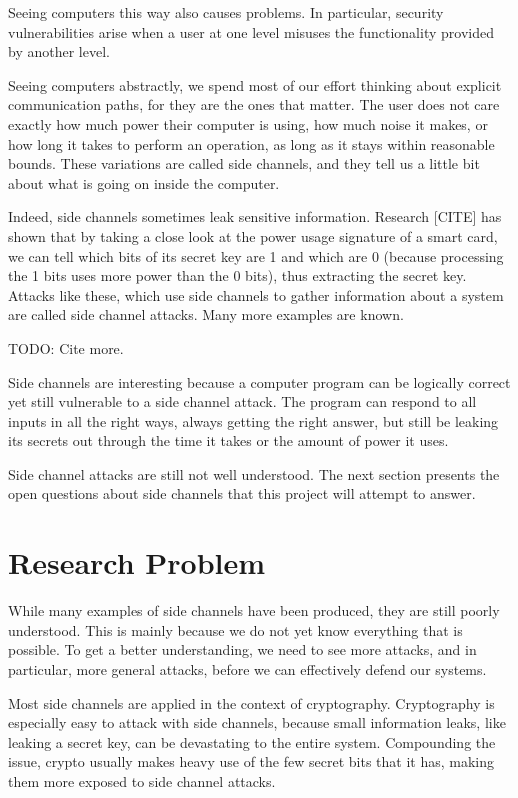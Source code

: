 \documentclass{acm_proc_article-sp}
\begin{document}
Seeing computers this way also causes problems. In particular, security
vulnerabilities arise when a user at one level misuses the functionality
provided by another level.

Seeing computers abstractly, we spend most of our effort thinking about explicit
communication paths, for they are the ones that matter. The user does not care
exactly how much power their computer is using, how much noise it makes, or how
long it takes to perform an operation, as long as it stays within reasonable
bounds. These variations are called side channels, and they tell us a little bit
about what is going on inside the computer.

Indeed, side channels sometimes leak sensitive information. Research [CITE] has
shown that by taking a close look at the power usage signature of a smart card,
we can tell which bits of its secret key are 1 and which are 0 (because
processing the 1 bits uses more power than the 0 bits), thus extracting the
secret key. Attacks like these, which use side channels to gather information
about a system are called side channel attacks. Many more examples are known.

TODO: Cite more.

Side channels are interesting because a computer program can be logically
correct yet still vulnerable to a side channel attack. The program can respond
to all inputs in all the right ways, always getting the right answer, but still
be leaking its secrets out through the time it takes or the amount of power it
uses.

Side channel attacks are still not well understood. The next section presents
the open questions about side channels that this project will attempt to answer.

\section{Research Problem}

While many examples of side channels have been produced, they are still poorly
understood. This is mainly because we do not yet know everything that is
possible. To get a better understanding, we need to see more attacks, and in
particular, more general attacks, before we can effectively defend our systems.

Most side channels are applied in the context of cryptography. Cryptography is
especially easy to attack with side channels, because small information leaks,
like leaking a secret key, can be devastating to the entire system. Compounding
the issue, crypto usually makes heavy use of the few secret bits that it has,
making them more exposed to side channel attacks.
\end{document}
